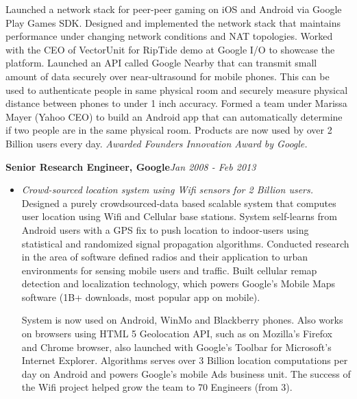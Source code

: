 \begin{resume}
\begin{itemize}
             Launched a network stack for peer-peer gaming on iOS and Android via Google Play Games SDK. Designed and
             implemented the network stack that maintains performance under changing network conditions and NAT
             topologies. Worked with the CEO of VectorUnit for RipTide demo at Google I/O to showcase the platform.
             Launched an API called Google Nearby that can transmit small amount of data securely over near-ultrasound
             for mobile phones. This can be used to authenticate people in same physical room and securely measure physical distance
             between phones to under 1 inch accuracy.
             Formed a team under Marissa Mayer (Yahoo CEO) to build an Android app that can automatically determine if two people
             are in the same physical room.
             Products are now used by over 2 Billion users every day.
             {\it Awarded Founders Innovation Award by Google.}
    \end{itemize}

    {\bf Senior Research Engineer, Google}\hfill{\it Jan 2008 - Feb 2013}
    \begin{itemize}
        \item[] {\it Crowd-sourced location system using Wifi sensors for 2 Billion users.}\\

             Designed a purely crowdsourced-data based scalable system that computes user location using Wifi and Cellular base
             stations. System self-learns from Android users with a GPS fix to push location to indoor-users using
             statistical and randomized signal propagation algorithms. 
	 Conducted research in the area of software defined radios and
	 their application to urban environments for sensing mobile users and
	 traffic. Built cellular remap detection and localization technology, which
	 powers Google's Mobile Maps software (1B+ downloads, most popular
	 app on mobile).
	 
	 System is now used on Android, WinMo and Blackberry phones. Also works on browsers using HTML 5 Geolocation API, such
	 as on Mozilla's Firefox and Chrome browser, also launched with Google's Toolbar for Microsoft's Internet Explorer.
            Algorithms serves over 3 Billion location computations per day on Android and powers Google's mobile Ads
            business unit. The success of the Wifi project helped grow the team to 70 Engineers (from 3).

    \end{itemize}


\end{resume}
